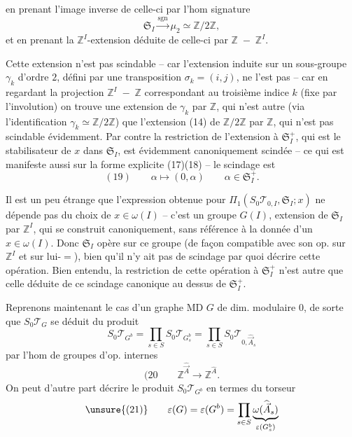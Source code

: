 en prenant l'image inverse de celle-ci par l'hom signature
\[
\mathfrak S_I\xrightarrow{\operatorname{sgn}}\mu_2\simeq\mathbb Z/2\mathbb Z,
\]
et en prenant la $\mathbb Z^I$-extension déduite de celle-ci par   $\mathbb Z\;-\;\mathbb Z^I$.

Cette extension n'est pas scindable -- car l'extension induite sur un sous-groupe $\gamma_k$ d'ordre $2$, défini par une transposition $\sigma_k=(i,j)$, ne l'est pas -- car en regardant la projection $\mathbb Z^I\;-\;\mathbb Z$ correspondant au troisième indice $k$ (fixe par l'involution) on trouve une extension de $\gamma_k$ par $\mathbb Z$, qui n'est autre (via l'identification $\gamma_k\simeq\mathbb Z/2\mathbb Z$) que l'extension (14) de $\mathbb Z/2\mathbb Z$ par $\mathbb Z$, qui n'est pas scindable évidemment. Par contre la restriction de l'extension à $\mathfrak S_I^+$, qui est le stabilisateur de $x$ dans $\mathfrak S_I$, est évidemment canoniquement scindée -- ce qui est manifeste aussi sur la forme explicite (17)(18) -- le scindage est
\[
(19)\qquad\alpha\longmapsto(0,\alpha)\qquad\alpha\in\mathfrak S_I^+.
\]

Il est un peu étrange que l'expression obtenue pour $\Pi_1(S_0\mathcal T_{0,I},\mathfrak S_I;x)$ ne dépende pas du choix de $x\in\omega(I)$ -- c'est un groupe $G(I)$, extension de $\mathfrak S_I$ par $\mathbb Z^I$, qui se construit canoniquement, sans référence à la donnée d'un $x\in\omega(I)$. Donc $\mathfrak S_I$ opère sur ce groupe  (de façon compatible avec son op. sur $\mathbb Z^I$ et sur lui-$=$), bien qu'il n'y ait pas de scindage par quoi décrire cette opération. Bien entendu, la restriction de cette opération à $\mathfrak S_I^+$ n'est autre que celle déduite de ce scindage canonique au dessus de $\mathfrak S_I^+$.


Reprenons maintenant le cas d'un graphe MD $G$ de dim. modulaire $0$, de sorte que $S_0\mathcal T_G$ se déduit du produit
\[
S_0\mathcal T_{G^b}=\prod_{s\in S}S_0\mathcal T_{G_s^b}
=\prod_{s\in S}S_0\mathcal T_{0,\widehat{\vec A}_s}
\]
par l'hom de groupes  d'op. internes
\[
(20\qquad\mathbb Z^{\widehat{\vec A}}\longrightarrow\mathbb Z^{\widehat A}.
\]
On peut d'autre part décrire le produit $S_0\mathcal T_{G^b}$ en termes du torseur
\[
\unsure{(21)}\qquad\varepsilon(G)=\varepsilon(G^b)=\prod_{s\in S}\underbrace{\omega(\widehat{\vec A}_s)}_{\varepsilon(G_s^b)}
\]

